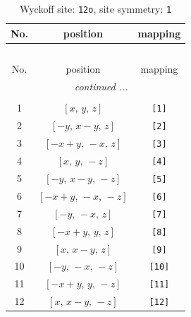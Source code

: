 \documentclass[fleqn,8pt]{jsarticle}
\begin{document}
\renewcommand{\arraystretch}{1.2}
\begin{longtable}{ccc}
\caption{Wyckoff site: {\tt 12o}, site symmetry: {\tt 1}}
 \\
 \hline \hline
No. & position & mapping \\ \hline \endfirsthead

\multicolumn{2}{l}{\tablename\ \thetable{}} \\
 \hline \hline
No. & position & mapping \\ \hline \endhead

 \hline \hline
\multicolumn{2}{r}{\footnotesize\it continued ...} \\ \endfoot

 \hline \hline
\multicolumn{2}{r}{} \\ \endlastfoot

1 & $\left[ x,\, y,\, z \right]$ & {\tt [1]} \\ \hline
2 & $\left[ - y,\, x - y,\, z \right]$ & {\tt [2]} \\ \hline
3 & $\left[ - x + y,\, - x,\, z \right]$ & {\tt [3]} \\ \hline
4 & $\left[ x,\, y,\, - z \right]$ & {\tt [4]} \\ \hline
5 & $\left[ - y,\, x - y,\, - z \right]$ & {\tt [5]} \\ \hline
6 & $\left[ - x + y,\, - x,\, - z \right]$ & {\tt [6]} \\ \hline
7 & $\left[ - y,\, - x,\, z \right]$ & {\tt [7]} \\ \hline
8 & $\left[ - x + y,\, y,\, z \right]$ & {\tt [8]} \\ \hline
9 & $\left[ x,\, x - y,\, z \right]$ & {\tt [9]} \\ \hline
10 & $\left[ - y,\, - x,\, - z \right]$ & {\tt [10]} \\ \hline
11 & $\left[ - x + y,\, y,\, - z \right]$ & {\tt [11]} \\ \hline
12 & $\left[ x,\, x - y,\, - z \right]$ & {\tt [12]} \\
\end{longtable}
\end{document}
